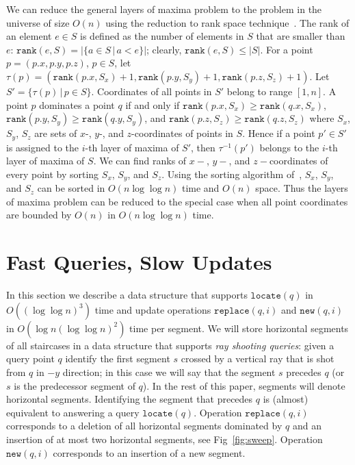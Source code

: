 \documentclass[10pt]{llncs}
\def\idtt#1{\ensuremath{\mathtt{#1}}}
\newcommand{\rank}{\idtt{rank}}
\newcommand{\replace}{\idtt{replace}}
\newcommand{\locate}{\idtt{locate}}
\newcommand{\new}{\idtt{new}}
\begin{document}
We can reduce the general layers of maxima problem to the problem in the universe of size $O(n)$ using the reduction to rank space
 technique~\cite{O88,GBT84}. 
The rank of an element $e\in S$ is defined as the number of elements in $S$ 
that are smaller than $e$: $\rank(e,S)=|\{a\in S\,|\, a<e \}|$; clearly, 
$\rank(e,S)\leq |S|$. 
For a point $p=(p.x,p.y,p.z)$, $p\in S$, 
 let $\tau(p)=(\rank(p.x,S_x)+1,\rank(p.y,S_y)+1,\rank(p.z,S_z)+1)$. 
Let $S'=\{\tau(p)\,|\, p\in S\}$. Coordinates of all points in $S'$ 
belong to range $[1,n]$. 
A point $p$ dominates a point $q$ if and only if 
$\rank(p.x,S_x)\geq \rank(q.x,S_x)$, $\rank(p.y,S_y)\geq \rank(q.y,S_y)$, and 
$\rank(p.z,S_z)\geq \rank(q.z,S_z)$ where $S_x$, $S_y$, $S_z$ are sets 
of $x$-, $y$-, and $z$-coordinates of points in $S$.  
Hence if a  point $p'\in S'$ is assigned to the 
$i$-th layer of maxima of $S'$, then $\tau^{-1}(p')$ belongs to the $i$-th 
layer of maxima of $S$. 
We can find ranks of $x-$, $y-$, and $z-$coordinates of every point by 
sorting $S_x$, $S_y$, and $S_z$. Using the sorting algorithm of~\cite{H04}, 
$S_x$, $S_y$, and $S_z$ can be sorted in $O(n\log \log n)$ time and $O(n)$ 
space. 
Thus the layers of maxima problem can be reduced to the special case when 
all point coordinates are bounded by $O(n)$ in $O(n\log \log n)$ time.  


\section{Fast Queries, Slow Updates}
\label{sec:fast}
In this section we describe a data structure that supports $\locate(q)$ in 
$O( (\log \log n)^3)$ time and update operations $\replace(q,i)$ and 
$\new(q,i)$ in $O(\log n(\log\log n)^2)$ time 
per segment.  We will store horizontal segments of all staircases 
in a data structure that supports \emph{ray shooting queries}: 
given a query point $q$ identify the first segment $s$ crossed by a vertical 
ray that is shot from $q$ in $-y$ direction; in this case 
we will say that the segment $s$ precedes $q$ (or $s$ is the predecessor
 segment of $q$). In the rest of this paper, segments will denote horizontal
 segments.
Identifying the segment that precedes $q$ 
is (almost) equivalent to answering a query $\locate(q)$.
Operation $\replace(q,i)$ corresponds to a deletion of all 
horizontal segments dominated by $q$ and an insertion of at most two 
horizontal segments, see Fig~\ref{fig:sweep}. 
Operation $\new(q,i)$ corresponds to an insertion of a new segment.  
\end{document}
